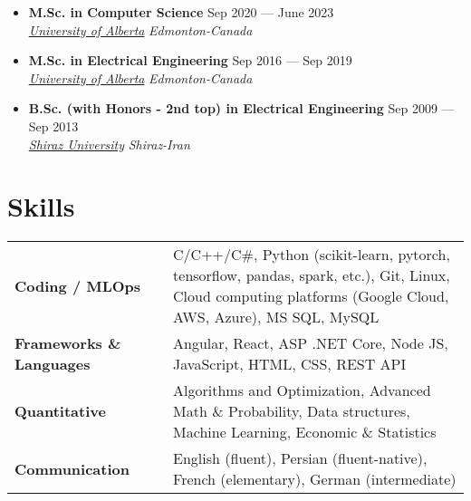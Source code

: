 \documentclass[10pt,letterpaper,sans]{moderncv} %
\begin{document}
	\begin{itemize}
		\item \textbf{M.Sc. in Computer Science} \hfill Sep 2020 --- June 2023 \\ 
		\href{https://ualberta.ca/}{ \emph{University of Alberta}} \hfill \emph{Edmonton-Canada}
		
		\item \textbf{M.Sc. in Electrical Engineering} \hfill Sep 2016 --- Sep 2019 \\ 
		\href{https://ualberta.ca/}{ \emph{University of Alberta}} \hfill \emph{Edmonton-Canada}
		
		\item \textbf{B.Sc. (with Honors - 2nd top) in Electrical Engineering} \hfill Sep 2009 --- Sep 2013 \\ 
		\href{https://ualberta.ca/}{ \emph{Shiraz University}} \hfill \emph{Shiraz-Iran}

	\end{itemize}
	
	
	
	\section{Skills}
	\renewcommand{\arraystretch}{1.1}
	\begin{tabular}{p{9em} p{1em} p{42em}}
		\textbf{Coding / MLOps} &  &   C/C++/C\#, Python (scikit-learn, pytorch, tensorflow, pandas, spark, etc.), Git, Linux, Cloud computing platforms (Google Cloud, AWS, Azure), MS SQL, MySQL \\
		\textbf{Frameworks \& Languages} & & Angular, React, ASP .NET Core, Node JS, JavaScript, HTML, CSS, REST API \\
		\textbf{Quantitative} & &  Algorithms and Optimization, Advanced Math \& Probability, Data structures, Machine Learning, Economic \& Statistics\\
		\textbf{Communication} & &  English (fluent), Persian (fluent-native), French (elementary), German (intermediate)\\
	\end{tabular}
	
\end{document}
